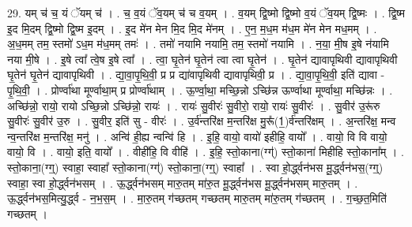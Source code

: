 \documentclass[17pt]{extarticle}
\begin{document}
29. यम् च॑ च॒ यं ॅयम् च॑ । . च॒ व॒यं ॅव॒यम् च॑ च व॒यम् । . व॒यम् द्वि॒ष्मो द्वि॒ष्मो व॒यं ॅव॒यम् द्वि॒ष्मः । . द्वि॒ष्म इ॒द मि॒दम् द्वि॒ष्मो द्वि॒ष्म इ॒दम् । . इ॒द मे॑न मेन मि॒द मि॒द मे॑नम् । . ए॒न॒ म॒ध॒म म॑ध॒म मे॑न मेन मध॒मम् । . अ॒ध॒मम् तम॒ स्तमो॑ ऽध॒म म॑ध॒मम् तमः॑ । . तमो॑ नयामि नयामि॒ तम॒ स्तमो॑ नयामि । . न॒या॒ मी॒ष इ॒षे न॑यामि नया मी॒षे । . इ॒षे त्वा᳚ त्वे॒ष इ॒षे त्वा᳚ । . त्वा॒ घृ॒तेन॑ घृ॒तेन॑ त्वा त्वा घृ॒तेन॑ । . घृ॒तेन॑ द्यावापृथिवी द्यावापृथिवी घृ॒तेन॑ घृ॒तेन॑ द्यावापृथिवी । . द्या॒वा॒पृ॒थि॒वी॒ प्र प्र द्या॑वापृथिवी द्यावापृथिवी॒ प्र । . द्या॒वा॒पृ॒थि॒वी॒ इति॑ द्यावा - पृ॒थि॒वी॒ । . प्रोर्ण्वा॑था मूर्ण्वाथा॒म् प्र प्रोर्ण्वा॑थाम् । . ऊ॒र्ण्वा॒था॒ मच्छि॒न्नो ऽच्छि॑न्न ऊर्ण्वाथा मूर्ण्वाथा॒ मच्छि॑न्नः । . अच्छि॑न्नो॒ रायो॒ रायो ऽच्छि॒न्नो ऽच्छि॑न्नो॒ रायः॑ । . रायः॑ सु॒वीरः॑ सु॒वीरो॒ रायो॒ रायः॑ सु॒वीरः॑ । . सु॒वीर॑ उ॒रू॑रु सु॒वीरः॑ सु॒वीर॑ उ॒रु । . सु॒वीर॒ इति॑ सु - वीरः॑ । . उ॒र्व॑न्तरि॑क्ष म॒न्तरि॑क्ष मु॒रू᳚(1॒)र्व॑न्तरि॑क्षम् । . अ॒न्तरि॑क्ष॒ मन्व न्व॒न्तरि॑क्ष म॒न्तरि॑क्ष॒ मनु॑ । . अन्वि॑ ही॒ह्य न्वन्वि॑ हि । . इ॒हि॒ वायो॒ वायो॑ इहीहि॒ वायो᳚ । . वायो॒ वि वि वायो॒ वायो॒ वि । . वायो॒ इति॒ वायो᳚ । . वीही॑हि॒ वि वीहि॑ । . इ॒हि॒ स्तो॒काना(ग्ग्॑) स्तो॒काना॑ मिहीहि स्तो॒काना᳚म् । . स्तो॒काना॒(ग्ग्॒) स्वाहा॒ स्वाहा᳚ स्तो॒काना(ग्ग्॑) स्तो॒काना॒(ग्ग्॒) स्वाहा᳚ । . स्वा हो॒र्द्ध्वन॑भस मू॒र्द्ध्वन॑भस॒(ग्ग्॒) स्वाहा॒ स्वा हो॒र्द्ध्वन॑भसम् । . ऊ॒र्द्ध्वन॑भसम् मारु॒तम् मा॑रु॒त मू॒र्द्ध्वन॑भस मू॒र्द्ध्वन॑भसम् मारु॒तम् । . ऊ॒र्द्ध्वन॑भस॒मित्यु॒र्द्ध्व - न॒भ॒स॒म् । . मा॒रु॒तम् ग॑च्छतम् गच्छतम् मारु॒तम् मा॑रु॒तम् ग॑च्छतम् । . ग॒च्छ॒त॒मिति॑ गच्छतम् । \newline
\end{document}
